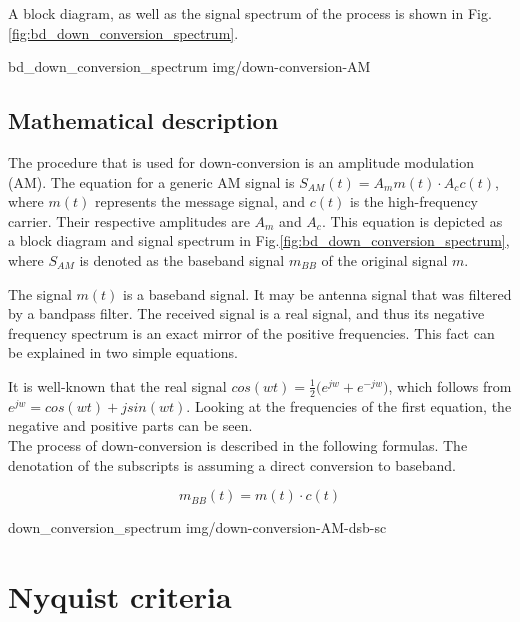 A block diagram, as well as the signal spectrum of the process is shown in Fig.\ref{fig:bd_down_conversion_spectrum}.

 {bd_down_conversion_spectrum} {img/down-conversion-AM}

\subsection{Mathematical description}

The procedure that is used for down-conversion is an amplitude modulation (AM).
The equation for a generic AM signal is $ S_{AM}(t) = A_m m(t) \cdot A_c c(t) $, where $m(t)$ represents the message signal, and $c(t)$ is the high-frequency carrier.
Their respective amplitudes are $A_m$ and $A_c$.
This equation is depicted as a block diagram and signal spectrum in Fig.\ref{fig:bd_down_conversion_spectrum}, where $S_{AM}$ is denoted as the baseband signal $m_{BB}$ of the original signal $m$.

The signal $m(t)$ is a baseband signal.
It may be antenna signal that was filtered by a bandpass filter.
The received signal is a real signal, and thus its negative frequency spectrum is an exact mirror of the positive frequencies.
This fact can be explained in two simple equations.

It is well-known that the real signal $cos(wt) = \frac{1}{2} \Big( e^{jw} + e^{-jw} \Big)$, which follows from $e^{jw} = cos(wt)+jsin(wt)$.
Looking at the frequencies of the first equation, the negative and positive parts can be seen.\\

The process of down-conversion is described in the following formulas.
The denotation of the subscripts is assuming a direct conversion to baseband.

\begin{equation}
  m_{BB}(t) = m(t) \cdot c(t)
\end{equation}



 {down_conversion_spectrum} {img/down-conversion-AM-dsb-sc}


\section{Nyquist criteria}

